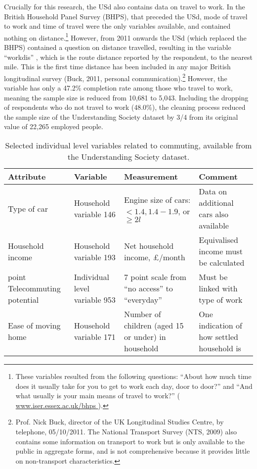 Crucially for this research, the USd also contains data on travel to work.
In the British Household Panel Survey (BHPS), that preceded the USd, mode of
travel to work and time of travel were the only variables
available, and contained nothing on distance.\footnote{These
variables resulted from the following questions: ``About how much time does it
usually take for you to get to work each
day, door to door?'' and ``And what usually is your main means of travel to
work?''
(\href{
https://www.iser.essex.ac.uk/bhps/documentation/pdf_versions/index.html}{
www.iser.essex.ac.uk/bhps }).
}
However, from 2011 onwards the USd (which replaced the BHPS) contained a
question on distance travelled, resulting in the variable ``workdis''
\citep{ESDS2011}, which is the route distance reported by the respondent, to
the nearest mile. This is the first time distance has been included in any major
British longitudinal survey (Buck, 2011, personal
communication).\footnote{Prof. Nick Buck, director of the UK Longitudinal
Studies Centre, by telephone, 05/10/2011. The National Transport Survey (NTS,
2009) also contains some information on transport to work but is only available
to the public in aggregate forms, and is not comprehensive because it
provides little on non-transport characteristics.
}
However, the
variable has only a 47.2\% completion rate among those who travel to work,
meaning the sample size is reduced from 10,681 to 5,043.
Including the dropping of respondents who do not travel to work (48.0\%), the
cleaning process reduced the sample size of the Understanding Society
dataset by 3/4 from its original value of 22,265 employed people.

\begin{table}[htbp]
\caption[Selected individual level variables related to commuting]{Selected
individual level variables related to commuting,
available from the Understanding Society dataset.}
\begin{tabular}{|p{2.5cm}|p{2.5cm}|p{4cm}|p{4cm}|}
\hline
Attribute & Variable & Measurement & Comment \\ \hline
Type of car & Household variable 146 & Engine size of cars: \hspace{1cm} $< 1.4
,
1.4-1.9 $, or $\ge 2 l$  & Data on additional cars also available \\
\hline
Household income & Household variable 193 & Net household income,
\pounds/month & Equivalised income must be calculated \\ \hline
point
Telecommuting potential & Individual level variable 953 & 7 point scale from “no
access”
to “everyday” & Must be linked with type of work \\ \hline
Ease of moving home & Household variable 171 & Number of children (aged 15 or
under) in household   & One indication of how settled household is \\ \hline
\end{tabular}
\label{t:indata}
\end{table}


